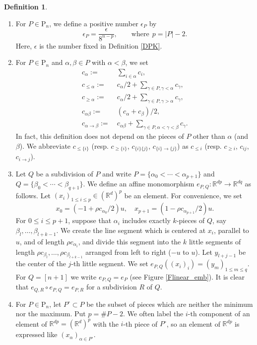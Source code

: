 \documentclass[reqno]{amsart}
\theoremstyle{definition}
\newtheorem{defi}{Definition}[section]
\theoremstyle{plain}
\newcommand{\eps}{\epsilon}
\newcommand{\RR}{\mathbb{R}}
\newcommand{\PP}{\mathrm{P}} %
\begin{document}
\begin{defi}\label{Dpunctured}
\begin{enumerate}
\item For $P\in \PP_n$, we define a positive number $\eps_P$ by
\[
\eps_P=\frac{\eps}{8^{n-p}},\qquad \text{where}\ \ p=|P|-2.
\]
Here, $\eps$ is the number fixed in Definition \ref{DPK}.

\item 
For $P\in \PP_n$ and $\alpha, \beta \in P$ with $\alpha<\beta$, we set 
\[
\begin{split}
c_\alpha:=& \ \sum_{i\in \alpha}c_i, \\
c_{\leq \alpha}:= & \ c_\alpha/2+\sum_{\gamma\in P, \gamma<\alpha}c_\gamma, \\
c_{\geq \alpha}:= & \ c_\alpha/2+\sum_{\gamma\in P, \gamma>\alpha}c_\gamma, \\
c_{\alpha \beta}:= & \ (c_\alpha+c_\beta)/2, \\
c_{\alpha\to \beta}:= & \ c_{\alpha\beta}+ \sum_{\gamma\in P, \alpha <\gamma< \beta}c_\gamma. 
\end{split}
\]
In fact, this definition does not depend on the pieces of $P$ other than $\alpha$ (and $\beta$). We abbreviate $c_{\leq \{i\}}$ (resp. $c_{\geq \{i\}}$, $c_{\{i\} \{j\} }$, $c_{\{i\}\to\{j\}}$) as $c_{\leq i}$ (resp. $c_{\geq i}$, $c_{ij}$, $c_{i\to j}$).
\item Let $Q$ be a subdivision of $P$ and write $P=\{\alpha_0<\cdots <\alpha_{p+1}\}$ and $Q=\{\beta_0<\cdots <\beta_{q+1}\}$. We define an affine monomorphism $e_{P,Q}:\RR^{dp}\to \RR^{dq}$ as follows. Let $(x_i)_{1\leq i\leq p}\in (\RR^d)^p$ be an element. For convenience, we set 
\[
x_0=(-1+\rho c_{\alpha_0}/2)u,\quad x_{p+1}=(1-\rho c_{\alpha_{p+1}}/2)u.
\] For $0\leq i\leq p+1$, suppose that $\alpha_i$ includes exactly $k$-pieces of $Q$, say $\beta_l,\dots, \beta_{l+k-1}$. We create the line segment which is centered at $x_i$, parallel to $u$, and of length $\rho c_{\alpha_i}$, and divide this segment into the $k$ little segments of length $\rho c_{\beta_l},\dots ,\rho c_{\beta_{l+k-1}}$ arranged from left to right ($-u$ to $u$). Let $y_{l+j-1}$ be the center of the $j$-th little segment. We set $e_{P,Q}((x_i)_{i})=(y_{m})_{1\leq m\leq q}$. For $Q=[n+1]$  we write $e_{P,Q}=e_P$ (see Figure \ref{Flinear_emb}). It is clear that $e_{Q,R}\circ e_{P,Q}=e_{P,R}$ for a subdivision $R$ of $Q$. 
\item For $P\in \PP_n$, let $P^\circ\subset P$ be the subset of pieces which are neither the minimum nor the maximum. Put $p=\# P-2$. We often label the $i$-th component of an element of $\RR^{dp}=(\RR^d)^p$ with the $i$-th piece of $P^\circ$, so an element of $\RR^{dp}$ is expressed  like $(x_\alpha)_{\alpha\in P^\circ}$.

\end{enumerate}
\end{defi}
\end{document}
